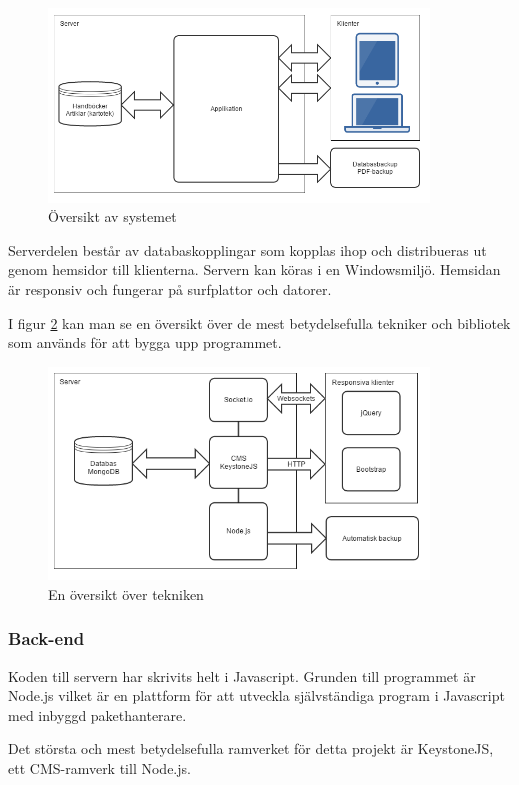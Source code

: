 \begin{figure}[H]
  \centering
  \includegraphics[width=0.9\textwidth]{images/overview.png}
  \caption{Översikt av systemet}
  \label{fig:overview}
\end{figure}
Serverdelen består av databaskopplingar som kopplas ihop och distribueras ut genom hemsidor till klienterna. Servern kan köras i en Windowsmiljö. Hemsidan är responsiv och fungerar på surfplattor och datorer.


I figur \ref{fig:techoverview} kan man se en översikt över de mest betydelsefulla tekniker och bibliotek som används för att bygga upp programmet.
\begin{figure}[H]
  \centering
  \includegraphics[width=0.9\textwidth]{images/techoverview.png}
  \caption{En översikt över tekniken}
  \label{fig:techoverview}
\end{figure}
\subsubsection{Back-end}
Koden till servern har skrivits helt i Javascript.
Grunden till programmet är Node.js vilket är en plattform för att utveckla självständiga program i Javascript med inbyggd pakethanterare.

Det största och mest betydelsefulla ramverket för detta projekt är KeystoneJS, ett CMS-ramverk till Node.js.

